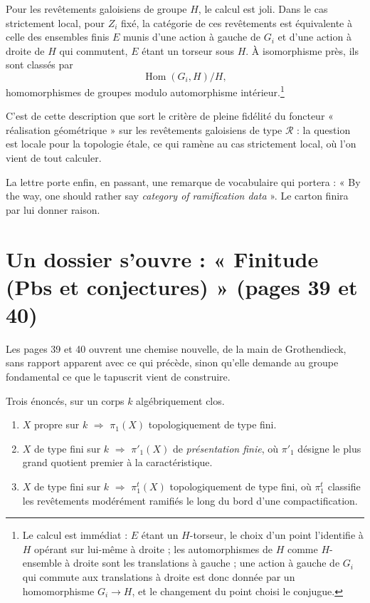 \documentclass[11pt,a4paper]{article}
\begin{document}
Pour les revêtements galoisiens de groupe $H$, le calcul est joli. Dans le cas
strictement local, pour $Z_{i}$ fixé, la catégorie de
ces revêtements est équivalente à celle des ensembles finis $E$ munis d'une
action à gauche de $G_{i}$ et d'une action à droite de $H$ qui commutent, $E$
étant un torseur sous $H$. À isomorphisme près, ils sont classés par
\[
  \operatorname{Hom}(G_{i}, H) \big/ H ,
\]
homomorphismes de groupes modulo automorphisme intérieur.\footnote{Le calcul
est immédiat : $E$ étant un $H$-torseur, le choix d'un
point l'identifie à $H$ opérant sur lui-même à droite ; les automorphismes de
$H$ comme $H$-ensemble à droite sont les translations à gauche ; une action à
gauche de $G_{i}$ qui commute aux translations à droite est donc donnée par un
homomorphisme $G_{i} \to H$, et le changement du point choisi le conjugue.}

C'est de cette description que sort le critère de pleine fidélité du foncteur
« réalisation géométrique » sur les revêtements galoisiens de type
$\mathcal{R}$ : la question est locale pour la topologie étale, ce qui ramène
au cas strictement local, où l'on vient de tout calculer.

La lettre porte enfin, en passant, une remarque de vocabulaire qui portera : « By the way, one should rather say \emph{category of ramification
data} ». Le carton finira par lui donner raison.

\section*{Un dossier s'ouvre : « Finitude (Pbs et conjectures) » (pages 39 et 40)}

Les pages 39 et 40 ouvrent une chemise nouvelle, de la main de
Grothendieck, sans rapport apparent avec ce qui précède, sinon qu'elle
demande au groupe fondamental ce que le tapuscrit vient de construire.

Trois énoncés, sur un corps $k$ algébriquement clos.

\begin{enumerate}
  \item[a)] $X$ propre sur $k$ $\Longrightarrow$ $\pi_{1}(X)$ topologiquement
    de type fini.
  \item[b)] $X$ de type fini sur $k$ $\Longrightarrow$ $\pi'_{1}(X)$ de
    \emph{présentation finie}, où $\pi'_{1}$ désigne le plus grand quotient
    premier à la caractéristique.
  \item[c)] $X$ de type fini sur $k$ $\Longrightarrow$ $\pi^{t}_{1}(X)$
    topologiquement de type fini, où $\pi^{t}_{1}$ classifie les revêtements
    modérément ramifiés le long du bord d'une compactification.
\end{enumerate}
\end{document}

